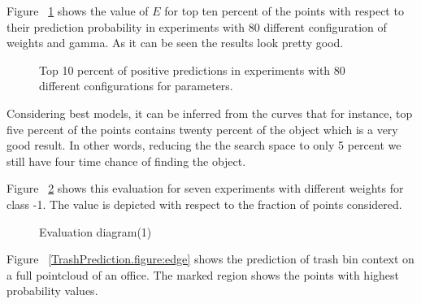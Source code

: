 Figure ~\ref{Eval80ExperimentTop10.figure} shows the value of $E$ for top ten percent of the points with respect to their 
prediction probability in experiments with 80 different configuration of weights and gamma.
As it can be seen the results look pretty good.

\begin{figure}[t]
  \caption[Evaluation result of 80 experiments]
  {Top 10 percent of positive predictions in experiments with 80 different configurations for parameters.}
  \label{Eval80ExperimentTop10.figure}
\end{figure}

Considering best models, it can be inferred from the curves that for instance, top five percent of the points contains twenty 
percent of the object which is a very good result. 
In other words, reducing the the search space to only 5 percent we still have four time chance of finding the object.

Figure ~\ref{evalSevenExp.figure} shows this evaluation for seven experiments with different weights for class -1. 
The value is depicted with respect to the fraction of points considered.

\begin{figure}[t]
  \caption[Evaluation diagram(1)]
  {Evaluation diagram(1)}
  \label{evalSevenExp.figure}
\end{figure}

Figure ~\ref{TrashPrediction.figure:edge} shows the prediction of trash bin context on a full pointcloud of an office. 
The marked region shows the points with highest probability values.

